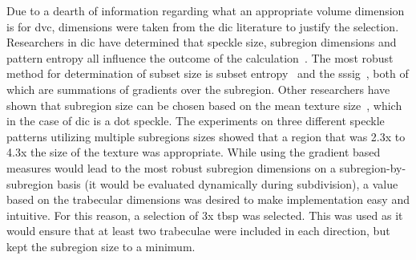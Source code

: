 Due to a dearth of information regarding what an appropriate volume dimension is for \ac{dvc}, dimensions were taken from the \ac{dic} literature to justify the selection.
Researchers in \ac{dic} have determined that speckle size, subregion dimensions and pattern entropy all influence the outcome of the calculation~\citep{pan_study_2008, yaofeng_study_2007, lecompte_quality_2006}.
The most robust method for determination of subset size is subset entropy~\citep{yaofeng_study_2007} and the \ac{sssig}~\citep{pan_study_2008}, both of which are summations of gradients over the subregion.
Other researchers have shown that subregion size can be chosen based on the mean texture size~\citep{lecompte_quality_2006}, which in the case of \ac{dic} is a dot speckle.
The experiments on three different speckle patterns utilizing multiple subregions sizes showed that a region that was 2.3x to 4.3x the size of the texture was appropriate.
While using the gradient based measures would lead to the most robust subregion dimensions on a subregion-by-subregion basis (it would be evaluated dynamically during subdivision), a value based on the trabecular dimensions was desired to make implementation easy and intuitive.
For this reason, a selection of 3x \ac{tbsp} was selected.
This was used as it would ensure that at least two trabeculae were included in each direction, but kept the subregion size to a minimum.


